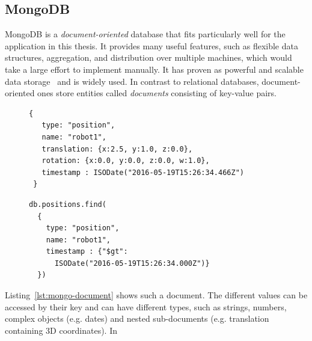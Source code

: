 \documentclass[a4paper,11pt]{article}
\newcommand{\reflst}[1]{Listing~\ref{#1}}
\begin{document}
\subsection{MongoDB}
\label{sec:mongodb}

MongoDB is a \emph{document-oriented}
database that fits particularly well for the application in this thesis. It
provides many useful features, such as flexible data structures, aggregation,
and distribution over multiple machines, which would take a large effort to
implement manually. It has proven as powerful and scalable data
storage~\cite{mongodb,RoboDB} and is widely used. In contrast to
relational databases, document-oriented ones store entities called
\emph{documents} consisting of key-value pairs.
\begin{figure}
  \begin{minipage}{0.6\linewidth}
\begin{lstlisting}[style=SmallJSON,
  caption={MongoDB document representing\protect\\ the position of a robot},
  label=lst:mongo-document,
  framexleftmargin=2pt, xleftmargin=2pt,
 morekeywords={}, numbers=none]
 {
   type: "position",
   name: "robot1",
   translation: {x:2.5, y:1.0, z:0.0},
   rotation: {x:0.0, y:0.0, z:0.0, w:1.0},
   timestamp : ISODate("2016-05-19T15:26:34.466Z")
 }
\end{lstlisting}
  \end{minipage}
  \begin{minipage}{0.4\linewidth}
\begin{lstlisting}[style=SmallJSON,
  caption={MongoDB query yielding the document in \reflst{lst:mongo-document}},
  label=lst:mongo-query,
  framexleftmargin=2pt, xleftmargin=10pt,
 morekeywords={}, numbers=none]
db.positions.find(
  {
    type: "position",
    name: "robot1",
    timestamp : {"$gt":
      ISODate("2016-05-19T15:26:34.000Z")}
  })
\end{lstlisting}
  \end{minipage}
  \vspace{-0.8cm}
\end{figure}
\reflst{lst:mongo-document} shows such a document.
The different
values can be accessed by their key and can have different types, such
as strings, numbers, complex objects (e.g. dates) and nested
sub-documents (e.g. translation containing 3D coordinates). In
\end{document}
